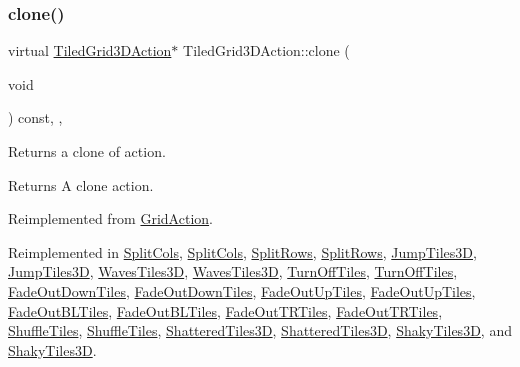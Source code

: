 \subsubsection{\texorpdfstring{clone()}{clone()}\hspace{0.1cm}{\footnotesize\ttfamily [2/2]}}
{\footnotesize\ttfamily virtual \hyperlink{classTiledGrid3DAction}{Tiled\+Grid3\+D\+Action}$\ast$ Tiled\+Grid3\+D\+Action\+::clone (\begin{DoxyParamCaption}\item[{void}]{ }\end{DoxyParamCaption}) const\hspace{0.3cm}{\ttfamily [inline]}, {\ttfamily [override]}, {\ttfamily [virtual]}}

Returns a clone of action.

\begin{DoxyReturn}{Returns}
A clone action. 
\end{DoxyReturn}


Reimplemented from \hyperlink{classGridAction_a081a9340e9289cf2dcbb6bde121d4f24}{Grid\+Action}.



Reimplemented in \hyperlink{classSplitCols_a209bd3c8ad9be47a9e9959bf9dc8afdf}{Split\+Cols}, \hyperlink{classSplitCols_a97e5eee11d109590c63b1c542a90f01e}{Split\+Cols}, \hyperlink{classSplitRows_a48c66e4c45079a55377b9dfa5a018930}{Split\+Rows}, \hyperlink{classSplitRows_ad03535f13689bc0d79030170ce12f5ba}{Split\+Rows}, \hyperlink{classJumpTiles3D_a2888c2609ac679b0ba04ade474fa87e6}{Jump\+Tiles3D}, \hyperlink{classJumpTiles3D_a65989f533d25fd290a6997f63d14072a}{Jump\+Tiles3D}, \hyperlink{classWavesTiles3D_a7c7d226d6bf5f33041a4c54d062757b8}{Waves\+Tiles3D}, \hyperlink{classWavesTiles3D_a950db06f66d1b1c3b5bdfe053db5bffb}{Waves\+Tiles3D}, \hyperlink{classTurnOffTiles_a270bb6ccc1a650fffa8c9165b4aba69a}{Turn\+Off\+Tiles}, \hyperlink{classTurnOffTiles_a8387f89056e2ec088e64d49d1701b2dc}{Turn\+Off\+Tiles}, \hyperlink{classFadeOutDownTiles_aa7b17d06be4e0d54a401464fd3edcee1}{Fade\+Out\+Down\+Tiles}, \hyperlink{classFadeOutDownTiles_a4a35c11502bbb834d6d4137cb03d2843}{Fade\+Out\+Down\+Tiles}, \hyperlink{classFadeOutUpTiles_af0311f93b8155bb8cd59db4320d630a0}{Fade\+Out\+Up\+Tiles}, \hyperlink{classFadeOutUpTiles_aa408cee44da1d5e8ebb41063d58a0de9}{Fade\+Out\+Up\+Tiles}, \hyperlink{classFadeOutBLTiles_ac52607f48d2a78ac604e4064bf72acec}{Fade\+Out\+B\+L\+Tiles}, \hyperlink{classFadeOutBLTiles_a09ddf5d56bdc979d963430286d50792b}{Fade\+Out\+B\+L\+Tiles}, \hyperlink{classFadeOutTRTiles_aa1b433c762335359829791f3b1d2b849}{Fade\+Out\+T\+R\+Tiles}, \hyperlink{classFadeOutTRTiles_af7a6bf6cfa4ef6cccae911b026e49b48}{Fade\+Out\+T\+R\+Tiles}, \hyperlink{classShuffleTiles_a77da891a86963aa76948363caa58dd52}{Shuffle\+Tiles}, \hyperlink{classShuffleTiles_aedd65e1a5cad0797a3d7cf30366e7de8}{Shuffle\+Tiles}, \hyperlink{classShatteredTiles3D_a9612352337be5982ea8fa78bde1abf02}{Shattered\+Tiles3D}, \hyperlink{classShatteredTiles3D_ae5b679ec020c8c3158c7b5c377d95c2f}{Shattered\+Tiles3D}, \hyperlink{classShakyTiles3D_aefe37a5cda9d6898ad9c573e5a220ce1}{Shaky\+Tiles3D}, and \hyperlink{classShakyTiles3D_ad83d154be5494000eb8fcfe657e503ff}{Shaky\+Tiles3D}.

